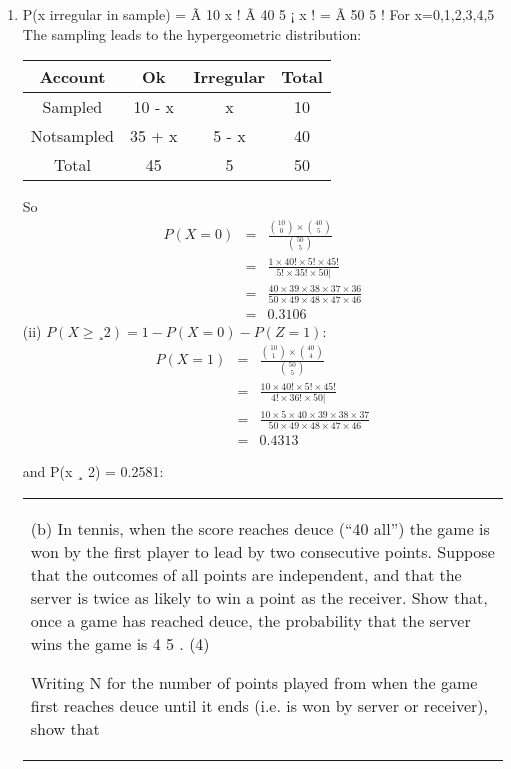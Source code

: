 \documentclass[a4paper,12pt]{article}
\begin{document}
\begin{enumerate}
\item P(x irregular in sample) =
Ã
10
x
! Ã
40
5 ¡ x
!
=
Ã
50
5
!
For x=0,1,2,3,4,5
The sampling leads to the hypergeometric distribution:

\begin{center}
\begin{tabular}{|c|c|c|c|}
Account & Ok & Irregular &  Total\\ \hline
Sampled & 10 - x & x & 10\\ \hline 
Notsampled & 35 + x & 5 - x & 40\\ \hline 
Total & 45 & 5 & 50 \\ \hline
\end{tabular}
\end{center}
So
\begin{eqnarray*}
P(X=0) &=& \frac{ {10 \choose 0} \times {40 \choose 5} }{ {50 \choose 5}}\\
&=& \frac{1 \times 40! \times 5!  \times 45!}{5! \times 35! \times 50|}\\
&=& \frac{ 40 \times 39 \times 38 \times 37 \times 36}{50 \times 49 \times 48 \times 47 \times 46}\\
&=& 0.3106
\end{eqnarray*}
(ii)
$P(X \geq¸ 2) = 1 - P(X = 0) - P(Z = 1):$
\begin{eqnarray*}
P(X=1) &=& \frac{ {10 \choose 1} \times {40 \choose 4} }{ {50 \choose 5}}\\
&=& \frac{10 \times 40! \times 5!  \times 45!}{4! \times 36! \times 50|}\\
&=& \frac{10 \times 5 \times 40 \times 39 \times 38 \times 37}{50 \times 49 \times 48 \times 47 \times 46}\\
&=& 0.4313
\end{eqnarray*}


and P(x ¸ 2) = 0.2581:
\newpage

\begin{table}[ht!]
     \centering
     \begin{tabular}{|p{15cm}|}
     \hline  
(b) In tennis, when the score reaches deuce (“40 all”) the game is won by the first player to lead by two consecutive points.  Suppose that the outcomes of all points are independent, and that the server is twice as likely to win a point as the receiver.  Show that, once a game has reached deuce, the probability that the server wins the game is 4 5 . (4) 
 
Writing N for the number of points played from when the game first reaches deuce until it ends (i.e. is won by server or receiver), show that 
 

\end{tabular}
\end{table}
\end{enumerate}
\end{document}
